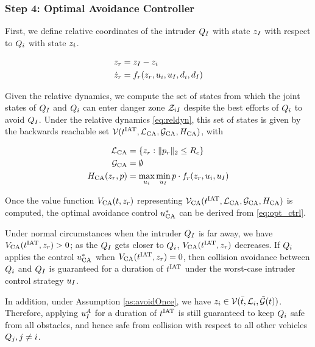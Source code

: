 \subsubsection{Step 4: Optimal Avoidance Controller \label{sec:intruder_avoid}}
First, we define relative coordinates of the intruder $Q_{I}$ with state $z_I$ with respect to $Q_{i}$ with state $z_i$.

\begin{equation}
\label{eq:reldyn}
\begin{aligned}
\state_r &= \state_\intr - \state_i \\
\dot \state_r &= f_r(\state_r, \ctrl_i, \ctrl_\intr, \dstb_i, \dstb_\intr)
\end{aligned}
\end{equation}

Given the relative dynamics, we compute the set of states from which the joint states of $Q_{I}$ and $Q_{i}$ can enter danger zone $\mathcal{Z}_{iI}$ despite the best efforts of $Q_{i}$ to avoid $Q_{I}$. Under the relative dynamics \eqref{eq:reldyn}, this set of states is given by the backwards reachable set $\mathcal{V}(t^\text{IAT}, \mathcal{L}_\text{CA}, \mathcal{G}_\text{CA}, H_\text{CA})$, with

\begin{equation}
\begin{aligned}
\mathcal{L}_\text{CA} &= \{z_r: \|p_r\|_2 \le R_c\} \\
\mathcal{G}_\text{CA} &= \emptyset \\
H_\text{CA}(z_r, p) &= \max_{u_i} \min_{u_I} p \cdot f_r(z_r, u_i, u_I)
\end{aligned}
\end{equation}

Once the value function $V_\text{CA}(t, z_r)$ representing $\mathcal{V}_\text{CA}(t^\text{IAT}, \mathcal{L}_\text{CA}, \mathcal{G}_\text{CA}, H_\text{CA})$ is computed, the optimal avoidance control $u^*_\text{CA}$ can be derived from \eqref{eq:opt_ctrl}.

Under normal circumstances when the intruder $Q_{I}$ is far away, we have $V_\text{CA}(t^\text{IAT}, z_r) > 0$; as the $Q_{I}$ gets closer to $Q_{i}$, $V_\text{CA}(t^\text{IAT}, z_r)$ decreases. If $Q_{i}$ applies the control $u^*_\text{CA}$ when $V_\text{CA}(t^\text{IAT}, z_r) = 0$, then collision avoidance between $Q_{i}$ and $Q_{I}$ is guaranteed for a duration of $t^\text{IAT}$ under the worst-case intruder control strategy $u_I$.

In addition, under Assumption \ref{as:avoidOnce}, we have $z_i \in \mathcal{V}(\bar t, \mathcal{L}_i, \tilde{\mathcal{G}}(t))$. Therefore, applying $u_I^A$ for a duration of $t^\text{IAT}$ is still guaranteed to keep $Q_{i}$ safe from all obstacles, and hence safe from collision with respect to all other vehicles $Q_{j}, j \neq i$.